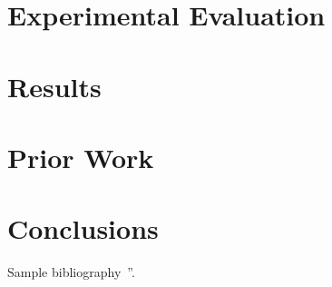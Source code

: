 \documentclass[12pt,letterpaper]{article}
\begin{document}
\section{Experimental Evaluation} \label{sec:evaluation}

\section{Results} \label{sec:results}

\section{Prior Work} \label{sec:prior_work}

\section{Conclusions} \label{sec:conclusions}


Sample bibliography~\cite{MRAM:Chen2008}''.




{\small


}
\end{document}
